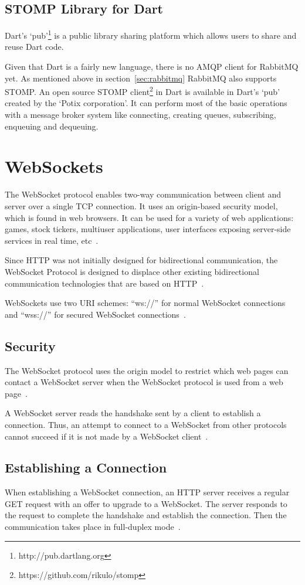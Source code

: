   \subsection{STOMP Library for Dart}
  \label{subsec:stompForDart}
  Dart's ‘pub’\footnote{http://pub.dartlang.org} is a public library sharing platform which allows users to share and reuse Dart code.

  Given that Dart is a fairly new language, there is no AMQP client for RabbitMQ yet. As mentioned above in section~\ref{sec:rabbitmq} RabbitMQ also supports STOMP. An open source STOMP client\footnote{https://github.com/rikulo/stomp} in Dart is available in Dart's ‘pub’ created by the ‘Potix corporation’. It can perform most of the basic operations with a message broker system like connecting, creating queues, subscribing, enqueuing and dequeuing.


\section{WebSockets}
\label{sec:websocket}
  The WebSocket protocol enables two-way communication between client and server over a single TCP connection. It uses an origin-based security model, which is found in web browsers. It can be used for a variety of web applications: games, stock tickers, multiuser applications, user interfaces exposing server-side services in real time, etc~\cite{rfc6455}.

  Since HTTP was not initially designed for bidirectional communication, the WebSocket Protocol is designed to displace other existing bidirectional communication technologies that are based on HTTP~\cite{rfc6455}.

  WebSockets use two URI schemes: “ws://” for normal WebSocket connections and “wss://” for secured WebSocket connections~\cite{rfc6455}.

\subsection{Security}
  The WebSocket protocol uses the origin model to restrict which web pages can contact a WebSocket server when the WebSocket protocol is used from a web page~\cite{rfc6455}.

   A WebSocket server reads the handshake sent by a client to establish a connection. Thus, an attempt to connect to a WebSocket from other protocols cannot succeed if it is not made by a WebSocket client~\cite{rfc6455}.

\subsection{Establishing a Connection}
  When establishing a WebSocket connection, an HTTP server receives a regular GET request with an offer to upgrade to a WebSocket. The server responds to the request to complete the handshake and establish the connection. Then the communication takes place in full-duplex mode~\cite{rfc6455}.

